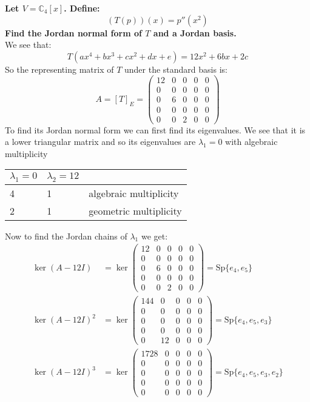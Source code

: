 \documentclass[11pt,a4paper]{article}
\theoremstyle{plain}
\newcommand{\Sp}{\text{Sp}}
\newcommand{\C}{\mathbb{C}}
\begin{document}
	\newpage
	\noindent
	\textbf{Let $V = \C_4[x]$. Define:
	\[
		(T(p))(x) = p''(x^2)
	\]
	Find the Jordan normal form of $T$ and a Jordan basis.} \\
	We see that:
	\[
		T(ax^4 + bx^3 + cx^2 + dx + e) =
		12x^2 + 6bx + 2c
	\]
	So the representing matrix of $T$ under the standard basis is:
	\[
		A = [T]_E = \left(\begin{matrix}
				12 & 0 & 0 & 0 & 0 \\
				0 & 0 & 0 & 0 & 0 \\
				0 & 6 & 0 & 0 & 0 \\
				0 & 0 & 0 & 0 & 0 \\
				0 & 0 & 2 & 0 & 0
				\end{matrix}\right)
	\]
	To find its Jordan normal form we can first find its eigenvalues.
	We see that it is a lower triangular matrix and so its eigenvalues
	are $\lambda_1 = 0$ with algebraic multiplicity
	\begin{center}	
	\begin{tabular}{ll | l}
	$\lambda_1 = 0$ & $\lambda_2 = 12$ & \\
	\hline
	4 & 1 & algebraic multiplicity\\
	2 & 1 & geometric multiplicity\\
	\end{tabular}
	\end{center}
	Now to find the Jordan chains of $\lambda_1$ we get:
	\begin{align*}
		\ker(A - 12I) &= \ker
		\left(\begin{matrix}
		12 & 0 & 0 & 0 & 0 \\
		0 & 0 & 0 & 0 & 0 \\
		0 & 6 & 0 & 0 & 0 \\
		0 & 0 & 0 & 0 & 0 \\
		0 & 0 & 2 & 0 & 0
		\end{matrix}\right) = 
		\Sp\{
		e_4,e_5
		\} \\
		\ker(A - 12I)^2 &= \ker
		\left(\begin{matrix}
		144 & 0 & 0 & 0 & 0 \\
		0 & 0 & 0 & 0 & 0 \\
		0 & 0 & 0 & 0 & 0 \\
		0 & 0 & 0 & 0 & 0 \\
		0 & 12 & 0 & 0 & 0
		\end{matrix}\right) = 
		\Sp\{
		e_4,e_5,e_3
		\} \\
		\ker(A - 12I)^3 &= \ker
		\left(\begin{matrix}
		1728 & 0 & 0 & 0 & 0 \\
		0 & 0 & 0 & 0 & 0 \\
		0 & 0 & 0 & 0 & 0 \\
		0 & 0 & 0 & 0 & 0 \\
		0 & 0 & 0 & 0 & 0
		\end{matrix}\right) = 
		\Sp\{
		e_4,e_5,e_3,e_2
		\}
	\end{align*}
\end{document}
